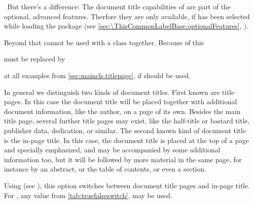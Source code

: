 %
\IfThisCommonLabelBase{scrextend}{\iftrue}{\csname iffalse\endcsname}%
  \ But there's a difference: The document title
  capabilities of  are part of the optional, advanced
  features. Therfore they are only available, if
   has been
  selected while loading the package (see
  \autoref{sec:\ThisCommonLabelBase.optionalFeatures},
  ).

  Beyond that  cannot be used with a \KOMAScript{}
  class together. Because of this
  must be replaced by
  at all examples from \autoref{sec:maincls.titlepage}, if 
  should be used.
\fi

In general we distinguish two kinds of document titles. First known are title
pages. In this case the document title will be placed together with additional
document information, like the author, on a page of its own. Besides the main
title page, several further title pages may exist, like the half-title or
bastard title, publisher data, dedication, or similar. The second known kind
of document title is the in-page title. In this case, the document title is
placed at the top of a page and specially emphasized, and may be accompanied
by some additional information too, but it will be followed by more material
in the same page, for instance by an abstract, or the table of contents, or
even a section.


\begin{Declaration}
\end{Declaration}%
Using  (see
), this option%
 switches between document title pages and in-page
title. For , any value from
\autoref{tab:truefalseswitch},  may be used.

